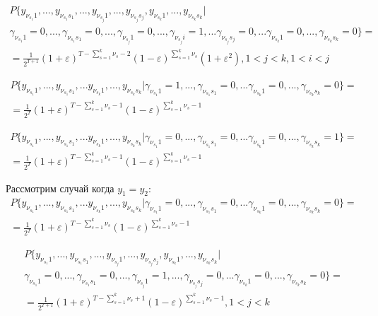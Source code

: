 \documentclass[a4paper,12pt]{article}
\theoremstyle{plain}
\begin{document}
  \begin{gather*}
  P\{y_{\nu_{s_1}1},..., y_{\nu_{s_1}s_1}, ...,y_{\nu_{s_j}1},...,y_{\nu_{s_j}s_j}, y_{\nu_{s_k}1},...,y_{\nu_{s_k}s_k}|\\ \gamma_{\nu_{s_1}1}=0, ..., \gamma_{\nu_{s_1}s_1}=0,...,\gamma_{\nu_{s_j}1}=0,...,\gamma_{\nu_{s_j}i}=1,...\gamma_{\nu_{s_j}s_j}=0,  ...\gamma_{\nu_{s_k}1}=0,...,\gamma_{\nu_{s_k}s_k}=0\} =\\  =\frac{1}{2^{T+1}}(1+\varepsilon)^{T-\sum\limits_{s=1}^{k}\nu_s-2} (1-\varepsilon)^{\sum\limits_{s=1}^{k}\nu_s}(1+\varepsilon^2), 1<j<k, 1<i<j
  \end{gather*} 
  
  \begin{gather*}
  P\{y_{\nu_{s_1}1},..., y_{\nu_{s_1}s_1}, ...y_{\nu_{s_k}1},...,y_{\nu_{s_k}s_k}|\gamma_{\nu_{s_1}1}=1,..., \gamma_{\nu_{s_1}s_1}=0, ...\gamma_{\nu_{s_k}1}=0,...,\gamma_{\nu_{s_k}s_k}=0\} =\\  =\frac{1}{2^T}(1+\varepsilon)^{T-\sum\limits_{s=1}^{k}\nu_s-1} (1-\varepsilon)^{\sum\limits_{s=1}^{k}\nu_s-1}
  \end{gather*} 
  
    \begin{gather*}
    P\{y_{\nu_{s_1}1},..., y_{\nu_{s_1}s_1}, ...y_{\nu_{s_k}1},...,y_{\nu_{s_k}s_k}|\gamma_{\nu_{s_1}1}=0,..., \gamma_{\nu_{s_1}s_1}=0, ...\gamma_{\nu_{s_k}1}=0,...,\gamma_{\nu_{s_k}s_k}=1\} =\\  =\frac{1}{2^T}(1+\varepsilon)^{T-\sum\limits_{s=1}^{k}\nu_s-1} (1-\varepsilon)^{\sum\limits_{s=1}^{k}\nu_s-1}
    \end{gather*} 
    
    
    Рассмотрим случай когда $y_1 = y_2$:
    \begin{gather*}
    P\{y_{\nu_{s_1}1},..., y_{\nu_{s_1}s_1}, ...y_{\nu_{s_k}1},...,y_{\nu_{s_k}s_k}|\gamma_{\nu_{s_1}1}=0,..., \gamma_{\nu_{s_1}s_1}=0, ...\gamma_{\nu_{s_k}1}=0,...,\gamma_{\nu_{s_k}s_k}=0\} =\\  =\frac{1}{2^T}(1+\varepsilon)^{T-\sum\limits_{s=1}^{k}\nu_s} (1-\varepsilon)^{\sum\limits_{s=1}^{k}\nu_s-1}
    \end{gather*} 
    
    
    \begin{gather*}
    P\{y_{\nu_{s_1}1},..., y_{\nu_{s_1}s_1}, ...,y_{\nu_{s_j}1},...,y_{\nu_{s_j}s_j}, y_{\nu_{s_k}1},...,y_{\nu_{s_k}s_k}|\\ \gamma_{\nu_{s_1}1}=0, ..., \gamma_{\nu_{s_1}s_1}=0,...,\gamma_{\nu_{s_j}1}=1,...,\gamma_{\nu_{s_j}s_j}=0,  ...\gamma_{\nu_{s_k}1}=0,...,\gamma_{\nu_{s_k}s_k}=0\} =\\  =\frac{1}{2^{T+1}}(1+\varepsilon)^{T-\sum\limits_{s=1}^{k}\nu_s+1} (1-\varepsilon)^{\sum\limits_{s=1}^{k}\nu_s-1}, 1<j<k
    \end{gather*} 
    
\end{document}
